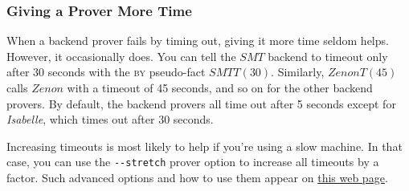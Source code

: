 \documentclass[fleqn,leqno]{article}
\begin{document}
  \vspace{-\baselineskip}%
\subsubsection*{Giving a Prover More Time}

When a backend prover fails by timing out, giving it more time seldom
helps.  However, it occasionally does.  You can tell the $SMT$ backend to
timeout only after 30 seconds with the \textsc{by} pseudo-fact
$SMTT(30)$.  Similarly, $ZenonT(45)$ calls $Zenon$ with a timeout of
45 seconds, and so on for the other backend provers.  By default, the
backend provers all time out after 5 seconds except for \emph{Isabelle},
which times out after 30 seconds.

Increasing timeouts is most likely to help if you're using a slow
machine.  In that case, you can use the \verb|--stretch| prover
option to increase all timeouts by a factor.  
Such advanced options and how to use them appear
on 
  \hyperref{http://tla.msr-inria.inria.fr/tlaps/content/Documentation/Tutorial/Advanced_options.html}{}{}{this web page}.
\end{document}
